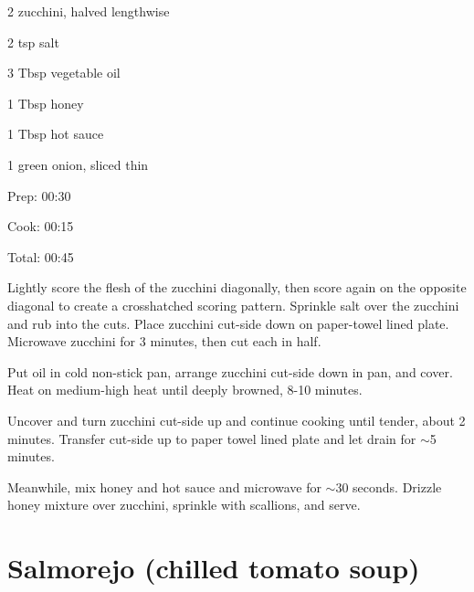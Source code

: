 \documentclass[oneside]{book}  %
\def\thisrecipe{}  %
\newcommand{\recipe}[1]{\section{#1}\def\thisrecipe{: #1}} %
\newcommand{\about}{$\sim$}
\begin{document}
\begin{IT}
  \begin{ingredients}
    \item[2] zucchini, halved lengthwise
    \item[2 tsp] salt
    \item[3 Tbsp] vegetable oil
    \item[1 Tbsp] honey
    \item[1 Tbsp] hot sauce
    \item[1] green onion, sliced thin
  \end{ingredients}

  \switchcolumn

  \begin{timeline}
    \item[Prep:]  00:30
    \item[Cook:]  00:15
    \item[Total:] 00:45
  \end{timeline}
\end{IT}

\begin{directions}
  \item Lightly score the flesh of the zucchini diagonally, then score again on
  the opposite diagonal to create a crosshatched scoring pattern. Sprinkle salt
  over the zucchini and rub into the cuts. Place zucchini cut-side down on
  paper-towel lined plate. Microwave zucchini for 3 minutes, then cut each in
  half.

  \item Put oil in cold non-stick pan, arrange zucchini cut-side down in pan,
  and cover. Heat on medium-high heat until deeply browned, 8-10 minutes.

  \item Uncover and turn zucchini cut-side up and continue cooking until tender,
  about 2 minutes. Transfer cut-side up to paper towel lined plate and let drain
  for \about 5 minutes.

  \item Meanwhile, mix honey and hot sauce and microwave for \about 30 seconds.
  Drizzle honey mixture over zucchini, sprinkle with scallions, and serve.
\end{directions}
\recipe{Salmorejo (chilled tomato soup)} \label{recipe:salmorejo} %
 
\end{document}
